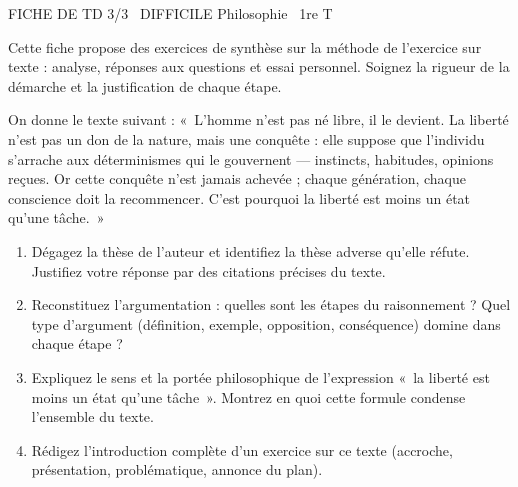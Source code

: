 \documentclass[11pt]{article}
\begin{document}
\begin{tcolorbox}[enhanced,colback=popink,colframe=popink,arc=10pt,boxrule=0pt,left=12pt,right=12pt,top=9pt,bottom=9pt]
{\color{white}\popxbold\small FICHE DE TD 3/3 \textbullet\ DIFFICILE \hfill Philosophie \textbullet\ 1re T\par}
\end{tcolorbox}
\vspace{4pt}
Cette fiche propose des exercices de synthèse sur la méthode de l'exercice sur texte : analyse, réponses aux questions et essai personnel. Soignez la rigueur de la démarche et la justification de chaque étape.

\begin{exercice}
On donne le texte suivant : «~L'homme n'est pas né libre, il le devient. La liberté n'est pas un don de la nature, mais une conquête : elle suppose que l'individu s'arrache aux déterminismes qui le gouvernent — instincts, habitudes, opinions reçues. Or cette conquête n'est jamais achevée ; chaque génération, chaque conscience doit la recommencer. C'est pourquoi la liberté est moins un état qu'une tâche.~»
\begin{enumerate}
\item Dégagez la thèse de l'auteur et identifiez la thèse adverse qu'elle réfute. Justifiez votre réponse par des citations précises du texte.
\item Reconstituez l'argumentation : quelles sont les étapes du raisonnement ? Quel type d'argument (définition, exemple, opposition, conséquence) domine dans chaque étape ?
\item Expliquez le sens et la portée philosophique de l'expression «~la liberté est moins un état qu'une tâche~». Montrez en quoi cette formule condense l'ensemble du texte.
\item Rédigez l'introduction complète d'un exercice sur ce texte (accroche, présentation, problématique, annonce du plan).
\end{enumerate}
\end{exercice}
\end{document}
